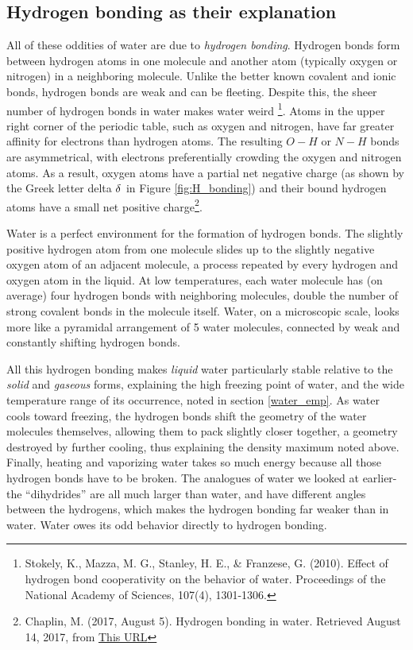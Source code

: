 \subsection{Hydrogen bonding as their explanation}
All of these oddities of water are due to \emph{hydrogen bonding}. Hydrogen bonds form between hydrogen atoms in one molecule and another atom (typically oxygen or nitrogen) in a neighboring molecule. Unlike the better known covalent and ionic bonds, hydrogen bonds are weak and can be fleeting. Despite this, the sheer number of hydrogen bonds in water makes water weird \footnote{Stokely, K., Mazza, M. G., Stanley, H. E., \& Franzese, G. (2010). Effect of hydrogen bond cooperativity on the behavior of water. Proceedings of the National Academy of Sciences, 107(4), 1301-1306.}. Atoms in the upper right corner of the periodic table, such as oxygen and nitrogen, have far greater affinity for electrons than hydrogen atoms. The resulting $O-H$ or $N-H$ bonds are asymmetrical, with electrons preferentially crowding the oxygen and nitrogen atoms. As a result, oxygen atoms have a partial net negative charge (as shown by the Greek letter delta $\delta^{\-}$ in Figure \ref{fig:H_bonding}) and their bound hydrogen atoms have a small net positive charge\footnote{Chaplin, M. (2017, August 5). Hydrogen bonding in water. Retrieved August 14, 2017, from \href{http://www1.lsbu.ac.uk/water/water_hydrogen_bonding.html}{This URL}}. 

Water is a perfect environment for the formation of hydrogen bonds. The slightly positive hydrogen atom from one molecule slides up to the slightly negative oxygen atom of an adjacent molecule, a process repeated by every hydrogen and oxygen atom in the liquid. At low temperatures, each water molecule has (on average) four hydrogen bonds with neighboring molecules, double the number of strong covalent bonds in the molecule itself. Water, on a microscopic scale, looks more like a pyramidal arrangement of 5 water molecules, connected by weak and constantly shifting hydrogen bonds. 
 
All this hydrogen bonding makes \emph{liquid} water particularly stable relative to the \emph{solid} and \emph{gaseous} forms, explaining the high freezing point of water, and the wide temperature range of its occurrence, noted in section \ref{water_emp}. As water cools toward freezing, the hydrogen bonds shift the geometry of the water molecules themselves, allowing them to pack slightly closer together, a geometry destroyed by further cooling, thus explaining the density maximum noted above. Finally, heating and vaporizing water takes so much energy because all those hydrogen bonds have to be broken. The analogues of water we looked at earlier-the ``dihydrides'' are all much larger than water, and have different angles between the hydrogens, which makes the hydrogen bonding far weaker than in water. Water owes its odd behavior directly to hydrogen bonding.           

